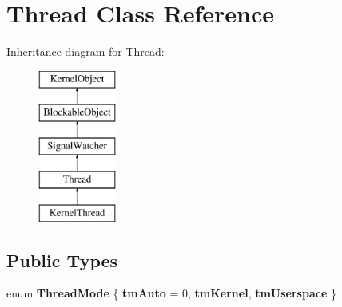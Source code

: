 \hypertarget{class_thread}{}\section{Thread Class Reference}
\label{class_thread}
Inheritance diagram for Thread\+:\begin{figure}[H]
\begin{center}
\leavevmode
\includegraphics[height=5.000000cm]{class_thread}
\end{center}
\end{figure}
\subsection*{Public Types}
\begin{DoxyCompactItemize}
\item 
\mbox{\label{class_thread_adecc7e24be3179a1ffbf6e1ee2466317}} 
enum {\bfseries Thread\+Mode} \{ {\bfseries tm\+Auto} = 0, 
{\bfseries tm\+Kernel}, 
{\bfseries tm\+Userspace}
 \}
\end{DoxyCompactItemize}
